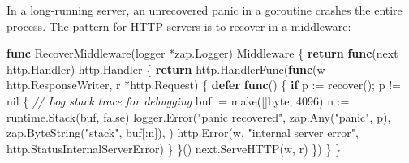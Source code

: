 \documentclass[
]{article}
\newenvironment{Shaded}{}{}
\newcommand{\BuiltInTok}[1]{\textcolor[rgb]{0.00,0.50,0.00}{#1}}
\newcommand{\CommentTok}[1]{\textcolor[rgb]{0.38,0.63,0.69}{\textit{#1}}}
\newcommand{\ControlFlowTok}[1]{\textcolor[rgb]{0.00,0.44,0.13}{\textbf{#1}}}
\newcommand{\DataTypeTok}[1]{\textcolor[rgb]{0.56,0.13,0.00}{#1}}
\newcommand{\DecValTok}[1]{\textcolor[rgb]{0.25,0.63,0.44}{#1}}
\newcommand{\KeywordTok}[1]{\textcolor[rgb]{0.00,0.44,0.13}{\textbf{#1}}}
\newcommand{\NormalTok}[1]{#1}
\newcommand{\OperatorTok}[1]{\textcolor[rgb]{0.40,0.40,0.40}{#1}}
\newcommand{\OtherTok}[1]{\textcolor[rgb]{0.00,0.44,0.13}{#1}}
\newcommand{\StringTok}[1]{\textcolor[rgb]{0.25,0.44,0.63}{#1}}
\begin{document}
In a long-running server, an unrecovered panic in a goroutine crashes
the entire process. The pattern for HTTP servers is to recover in a
middleware:

\begin{Shaded}
\begin{Highlighting}[]
\KeywordTok{func}\NormalTok{ RecoverMiddleware}\OperatorTok{(}\NormalTok{logger }\OperatorTok{*}\NormalTok{zap}\OperatorTok{.}\NormalTok{Logger}\OperatorTok{)}\NormalTok{ Middleware }\OperatorTok{\{}
    \ControlFlowTok{return} \KeywordTok{func}\OperatorTok{(}\NormalTok{next http}\OperatorTok{.}\NormalTok{Handler}\OperatorTok{)}\NormalTok{ http}\OperatorTok{.}\NormalTok{Handler }\OperatorTok{\{}
        \ControlFlowTok{return}\NormalTok{ http}\OperatorTok{.}\NormalTok{HandlerFunc}\OperatorTok{(}\KeywordTok{func}\OperatorTok{(}\NormalTok{w http}\OperatorTok{.}\NormalTok{ResponseWriter}\OperatorTok{,}\NormalTok{ r }\OperatorTok{*}\NormalTok{http}\OperatorTok{.}\NormalTok{Request}\OperatorTok{)} \OperatorTok{\{}
            \ControlFlowTok{defer} \KeywordTok{func}\OperatorTok{()} \OperatorTok{\{}
                \ControlFlowTok{if}\NormalTok{ p }\OperatorTok{:=} \BuiltInTok{recover}\OperatorTok{();}\NormalTok{ p }\OperatorTok{!=} \OtherTok{nil} \OperatorTok{\{}
                    \CommentTok{// Log stack trace for debugging}
\NormalTok{                    buf }\OperatorTok{:=} \BuiltInTok{make}\OperatorTok{([]}\DataTypeTok{byte}\OperatorTok{,} \DecValTok{4096}\OperatorTok{)}
\NormalTok{                    n }\OperatorTok{:=}\NormalTok{ runtime}\OperatorTok{.}\NormalTok{Stack}\OperatorTok{(}\NormalTok{buf}\OperatorTok{,} \OtherTok{false}\OperatorTok{)}
\NormalTok{                    logger}\OperatorTok{.}\NormalTok{Error}\OperatorTok{(}\StringTok{"panic recovered"}\OperatorTok{,}
\NormalTok{                        zap}\OperatorTok{.}\NormalTok{Any}\OperatorTok{(}\StringTok{"panic"}\OperatorTok{,}\NormalTok{ p}\OperatorTok{),}
\NormalTok{                        zap}\OperatorTok{.}\NormalTok{ByteString}\OperatorTok{(}\StringTok{"stack"}\OperatorTok{,}\NormalTok{ buf}\OperatorTok{[:}\NormalTok{n}\OperatorTok{]),}
                    \OperatorTok{)}
\NormalTok{                    http}\OperatorTok{.}\NormalTok{Error}\OperatorTok{(}\NormalTok{w}\OperatorTok{,} \StringTok{"internal server error"}\OperatorTok{,}\NormalTok{ http}\OperatorTok{.}\NormalTok{StatusInternalServerError}\OperatorTok{)}
                \OperatorTok{\}}
            \OperatorTok{\}()}
\NormalTok{            next}\OperatorTok{.}\NormalTok{ServeHTTP}\OperatorTok{(}\NormalTok{w}\OperatorTok{,}\NormalTok{ r}\OperatorTok{)}
        \OperatorTok{\})}
    \OperatorTok{\}}
\OperatorTok{\}}
\end{Highlighting}
\end{Shaded}
\end{document}
